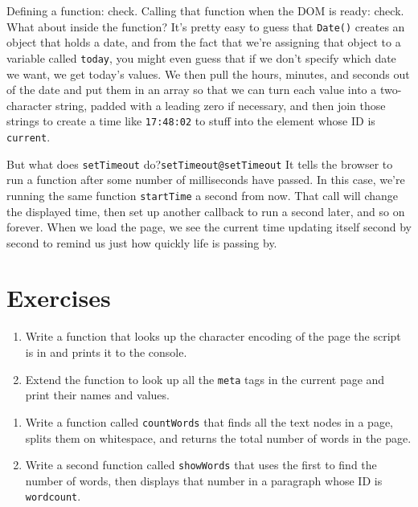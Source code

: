 Defining a function: check.
Calling that function when the DOM is ready: check.
What about inside the function?
It's pretty easy to guess that \texttt{Date()} creates an object that holds a date,
and from the fact that we're assigning that object to a variable called \texttt{today},
you might even guess that if we don't specify which date we want,
we get today's values.
We then pull the hours, minutes, and seconds out of the date and put them in an array
so that we can turn each value into a two-character string,
padded with a leading zero if necessary,
and then join those strings to create a time like \texttt{17:48:02}
to stuff into the element whose ID is \texttt{current}.

But what does \texttt{setTimeout} do?\texttt{setTimeout@\texttt{setTimeout}}
It tells the browser to run a function after some number of milliseconds have passed.
In this case,
we're running the same function \texttt{startTime} a second from now.
That call will change the displayed time,
then set up another callback to run a second later,
and so on forever.
When we load the page,
we see the current time updating itself second by second
to remind us just how quickly life is passing by.

\section{Exercises}\label{s:pages-exercises}


\begin{enumerate}
\item
  Write a function that looks up the character encoding of the page the script is in
  and prints it to the console.
\item
  Extend the function to look up all the \texttt{meta} tags in the current page
  and print their names and values.
\end{enumerate}


\begin{enumerate}
\item
  Write a function called \texttt{countWords} that finds all the text nodes in a page,
  splits them on whitespace,
  and returns the total number of words in the page.
\item
  Write a second function called \texttt{showWords} that uses the first to find the number of words,
  then displays that number in a paragraph whose ID is \texttt{wordcount}.
\end{enumerate}

